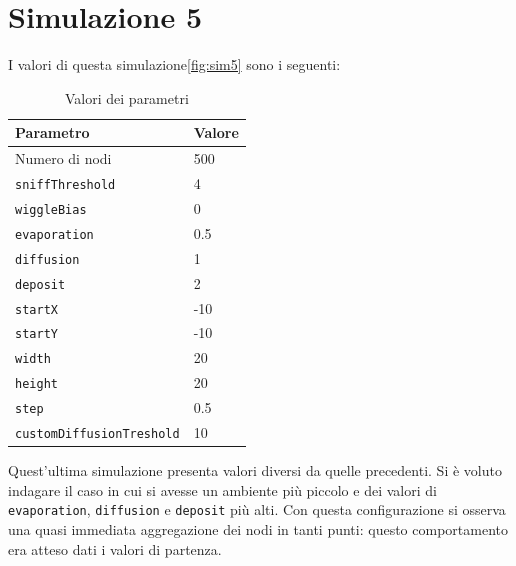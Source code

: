 \section{Simulazione 5}\label{sim5}
I valori di questa simulazione\space \cref{fig:sim5} sono i seguenti:
\begin{table}[ht]
    \centering
    \caption{Valori dei parametri}
    \begin{tabular}{ll}
        \hline
        Parametro                   & Valore \\
        \hline
        Numero di nodi              & 500    \\
        \texttt{sniffThreshold}     & 4      \\
        \texttt{wiggleBias}         & 0      \\
        \texttt{evaporation}        & 0.5    \\
        \texttt{diffusion}          & 1 \\
        \texttt{deposit}            & 2      \\
        \texttt{startX}             & -10    \\
        \texttt{startY}             & -10    \\
        \texttt{width}              & 20     \\
        \texttt{height}             & 20     \\
        \texttt{step}               & 0.5    \\
        \texttt{customDiffusionTreshold} & 10 \\
        \hline
    \end{tabular}\label{tab:parametri5}
\end{table}\newline
Quest'ultima simulazione presenta valori diversi da quelle precedenti. Si è voluto indagare il caso
in cui si avesse un ambiente più piccolo e dei valori di \texttt{evaporation}, \texttt{diffusion} e \texttt{deposit} 
più alti. Con questa configurazione si osserva una quasi immediata aggregazione dei nodi in tanti punti: questo comportamento
era atteso dati i valori di partenza.


